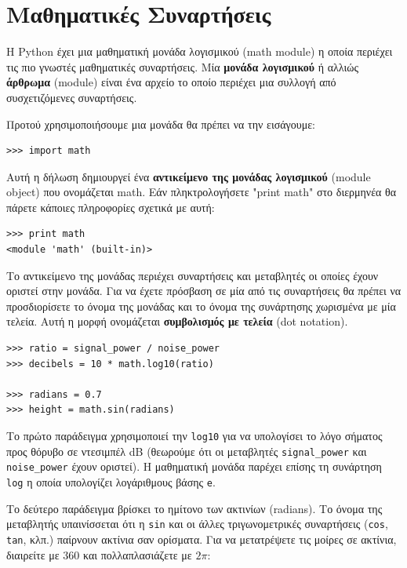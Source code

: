 \documentclass[10pt]{book}
\begin{document}
\section{Μαθηματικές Συναρτήσεις}
Η Python έχει μια μαθηματική μονάδα λογισμικού (math module) η οποία περιέχει τις πιο γνωστές μαθηματικές συναρτήσεις. Μία {\bf μονάδα λογισμικού} ή αλλιώς {\bf άρθρωμα} (module) είναι ένα αρχείο το οποίο περιέχει μια συλλογή από συσχετιζόμενες συναρτήσεις.

Προτού χρησιμοποιήσουμε μια μονάδα θα πρέπει να την εισάγουμε:

\begin{verbatim}
>>> import math
\end{verbatim}
%

Αυτή η δήλωση δημιουργεί ένα {\bf αντικείμενο της μονάδας λογισμικού} (module object) που ονομάζεται math. Εάν πληκτρολογήσετε "print math" στο διερμηνέα θα πάρετε κάποιες πληροφορίες σχετικά με αυτή:

\begin{verbatim}
>>> print math
<module 'math' (built-in)>
\end{verbatim}
%

Το αντικείμενο της μονάδας περιέχει συναρτήσεις και μεταβλητές οι οποίες
έχουν οριστεί στην μονάδα. Για να έχετε πρόσβαση σε μία από τις συναρτήσεις 
θα πρέπει να προσδιορίσετε το όνομα της μονάδας και το όνομα της συνάρτησης 
χωρισμένα με μία τελεία. Αυτή η μορφή ονομάζεται {\bf συμβολισμός με τελεία} (dot notation).

\begin{verbatim}
>>> ratio = signal_power / noise_power
>>> decibels = 10 * math.log10(ratio)

>>> radians = 0.7
>>> height = math.sin(radians)
\end{verbatim}
%

Το πρώτο παράδειγμα χρησιμοποιεί την \verb"log10" για να υπολογίσει
το λόγο σήματος προς θόρυβο σε ντεσιμπέλ  dB  (θεωρούμε ότι οι μεταβλητές
\verb"signal_power" και \verb"noise_power" έχουν οριστεί). Η μαθηματική μονάδα
παρέχει επίσης τη συνάρτηση {\tt log} η οποία υπολογίζει λογάριθμους 
βάσης {\tt e}.


Το δεύτερο παράδειγμα βρίσκει το ημίτονο των ακτινίων (radians). 
Το όνομα της μεταβλητής υπαινίσσεται ότι η {\tt sin} και οι άλλες
τριγωνομετρικές συναρτήσεις ({\tt cos}, {\tt tan}, κλπ.) παίρνουν
ακτίνια σαν ορίσματα. Για να μετατρέψετε τις μοίρες σε ακτίνια, διαιρείτε
με 360 και πολλαπλασιάζετε με $2 \pi$:
\end{document}
